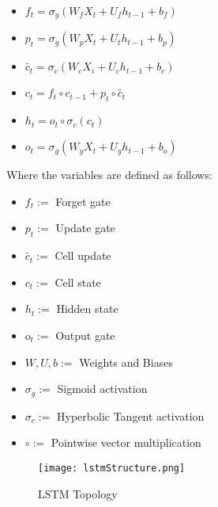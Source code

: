 \documentclass[11pt]{article}
\begin{document}
\begin{multicols*}{2}
                    \begin{itemize}
                        \item $f_t = \sigma_{g}(W_{f}X_{t} + U_{f}h_{t-1} + b_{f})$ 
                        \item $p_t = \sigma_{g}(W_{p}X_{t} + U_{t}h_{t-1} + b_{p})$
                        \item $\tilde{c_t} = \sigma_{c}(W_{c}X_{i} + U_{c}h_{t-1} + b_{c})$ 
                        \item $c_t = f_t \circ c_{t-1} + p_t \circ \tilde{c_t}$
                        \item $h_t = o_t \circ \sigma_c(c_t)$
                        \item $o_t = \sigma_{g}(W_{y}X_{t} + U_{y}h_{t-1} + b_{o})$
                    \end{itemize}

                    Where the variables are defined as follows:

                    \begin{itemize}
                        \item $f_t := $ Forget gate   
                        \item $p_t := $ Update gate
                        \item $\tilde{c_t} := $ Cell update  
                        \item $c_t := $ Cell state
                        \item $h_t := $ Hidden state
                        \item $o_t := $ Output gate
                        \item $W,U,b := $ Weights and Biases
                        \item $\sigma_g := $ Sigmoid activation
                        \item $\sigma_c := $ Hyperbolic Tangent activation
                        \item $\circ := $ Pointwise vector multiplication
                    \end{itemize}

                    \end{multicols*}
                    \begin{figure}[ht]
                        \texttt{[image: lstmStructure.png]}
                        \caption{LSTM Topology}
                        \label{fig:LSTM Topology}
                    \end{figure}
\end{document}
